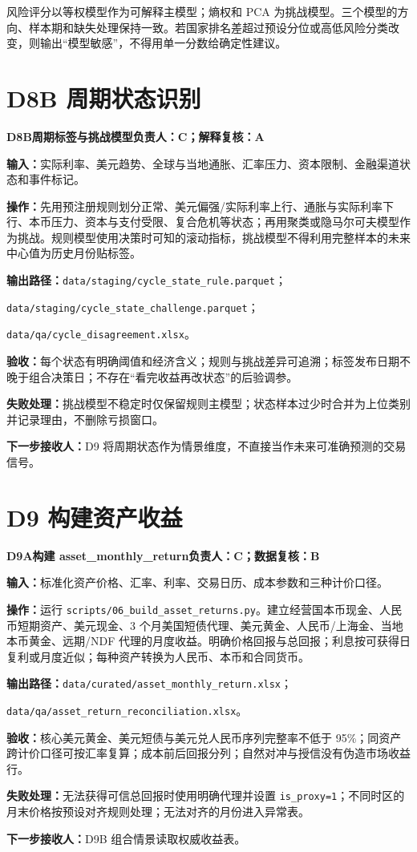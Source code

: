 \documentclass[UTF8,fontset=windows,12pt,openany]{ctexbook}
\newcommand{\Field}[1]{{\small\nolinkurl{#1}}}
\newcommand{\File}[1]{{\small\nolinkurl{#1}}}
\newcommand{\StepTitle}[3]{%
  \noindent\colorbox{DeepNavy}{\parbox{0.965\textwidth}{\color{white}\Large\bfseries #1\quad #2\hfill\normalsize #3}}\par\medskip
}
\newcommand{\CardRow}[2]{\noindent\textbf{#1：}#2\par}
\begin{document}
风险评分以等权模型作为可解释主模型；熵权和 PCA 为挑战模型。三个模型的方向、样本期和缺失处理保持一致。若国家排名差超过预设分位或高低风险分类改变，则输出“模型敏感”，不得用单一分数给确定性建议。

\newpage
\section{D8B 周期状态识别}
\StepTitle{D8B}{周期标签与挑战模型}{负责人：C；解释复核：A}
\CardRow{输入}{实际利率、美元趋势、全球与当地通胀、汇率压力、资本限制、金融渠道状态和事件标记。}
\CardRow{操作}{先用预注册规则划分正常、美元偏强/实际利率上行、通胀与实际利率下行、本币压力、资本与支付受限、复合危机等状态；再用聚类或隐马尔可夫模型作为挑战。规则模型使用决策时可知的滚动指标，挑战模型不得利用完整样本的未来中心值为历史月份贴标签。}
\CardRow{输出路径}{\File{data/staging/cycle_state_rule.parquet}；\par\File{data/staging/cycle_state_challenge.parquet}；\par\File{data/qa/cycle_disagreement.xlsx}。}
\CardRow{验收}{每个状态有明确阈值和经济含义；规则与挑战差异可追溯；标签发布日期不晚于组合决策日；不存在“看完收益再改状态”的后验调参。}
\CardRow{失败处理}{挑战模型不稳定时仅保留规则主模型；状态样本过少时合并为上位类别并记录理由，不删除亏损窗口。}
\CardRow{下一步接收人}{D9 将周期状态作为情景维度，不直接当作未来可准确预测的交易信号。}

\newpage
\section{D9 构建资产收益}
\StepTitle{D9A}{构建 asset\_monthly\_return}{负责人：C；数据复核：B}
\CardRow{输入}{标准化资产价格、汇率、利率、交易日历、成本参数和三种计价口径。}
\CardRow{操作}{运行 \File{scripts/06_build_asset_returns.py}。建立经营国本币现金、人民币短期资产、美元现金、3 个月美国短债代理、美元黄金、人民币/上海金、当地本币黄金、远期/NDF 代理的月度收益。明确价格回报与总回报；利息按可获得日复利或月度近似；每种资产转换为人民币、本币和合同货币。}
\CardRow{输出路径}{\File{data/curated/asset_monthly_return.xlsx}；\par\File{data/qa/asset_return_reconciliation.xlsx}。}
\CardRow{验收}{核心美元黄金、美元短债与美元兑人民币序列完整率不低于 95\%；同资产跨计价口径可按汇率复算；成本前后回报分列；自然对冲与授信没有伪造市场收益行。}
\CardRow{失败处理}{无法获得可信总回报时使用明确代理并设置 \Field{is_proxy=1}；不同时区的月末价格按预设对齐规则处理；无法对齐的月份进入异常表。}
\CardRow{下一步接收人}{D9B 组合情景读取权威收益表。}
\end{document}
